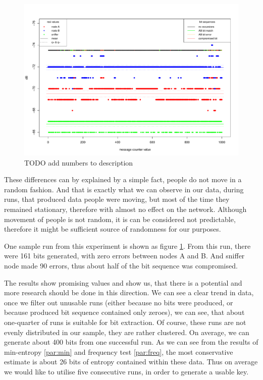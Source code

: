 \documentclass[
  print, %
  Table,   %
  nolof,     %
  nolot,     %
           oneside
]{fithesis3}
\begin{document}
  \begin{figure}
    \includegraphics[height=\textwidth, angle = 90]{../images/graph_rssi_04.pdf}
  \caption{TODO add numbers to description}
  \label{fig:rssi_04}
  \end{figure}


  These differences can by explained by a simple fact, people do not move in a random fashion. And that is exactly what we can observe in our data, during runs, that produced data people were moving, but most of the time they remained stationary, therefore with almost no effect on the network. Although movement of people is not random, it is can be considered not predictable, therefore it might be sufficient source of randomness for our purposes.


  One sample run from this experiment is shown as figure \ref{fig:rssi_04}. From this run, there were 161 bits generated, with zero errors between nodes A and B. And sniffer node made 90 errors, thus about half of the bit sequence was compromised.

  The results show promising values and show us, that there is a potential and more research should be done in this direction. We can see a clear trend in data, once we filter out unusable runs (either because no bits were produced, or because produced bit sequence contained only zeroes), we can see, that about one-quarter of runs is suitable for bit extraction. Of course, these runs are not evenly distributed in our sample, they are rather clustered. On average, we can generate about 400 bits from one successful run. As we can see from the results of min-entropy \ref{par:min} and frequency test \ref{par:freq}, the most conservative estimate is about 26 bits of entropy contained within these data. Thus on average we would like to utilise five consecutive runs, in order to generate a usable key.
\end{document}
